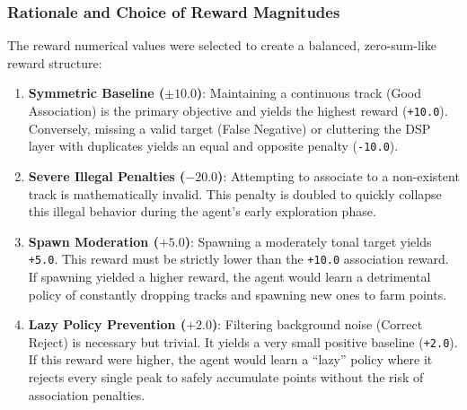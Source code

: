 \documentclass[12pt,a4paper]{article}
\begin{document}
\subsubsection{Rationale and Choice of Reward Magnitudes}
The reward numerical values were selected to create a balanced, zero-sum-like reward structure:
\begin{enumerate}
    \item \textbf{Symmetric Baseline ($\pm10.0$)}: Maintaining a continuous track (Good Association) is the primary objective and yields the highest reward (\texttt{+10.0}). Conversely, missing a valid target (False Negative) or cluttering the DSP layer with duplicates yields an equal and opposite penalty (\texttt{-10.0}).
    \item \textbf{Severe Illegal Penalties ($-20.0$)}: Attempting to associate to a non-existent track is mathematically invalid. This penalty is doubled to quickly collapse this illegal behavior during the agent's early exploration phase.
    \item \textbf{Spawn Moderation ($+5.0$)}: Spawning a moderately tonal target yields \texttt{+5.0}. This reward must be strictly lower than the \texttt{+10.0} association reward. If spawning yielded a higher reward, the agent would learn a detrimental policy of constantly dropping tracks and spawning new ones to farm points.
    \item \textbf{Lazy Policy Prevention ($+2.0$)}: Filtering background noise (Correct Reject) is necessary but trivial. It yields a very small positive baseline (\texttt{+2.0}). If this reward were higher, the agent would learn a ``lazy'' policy where it rejects every single peak to safely accumulate points without the risk of association penalties.
\end{enumerate}
\end{document}
